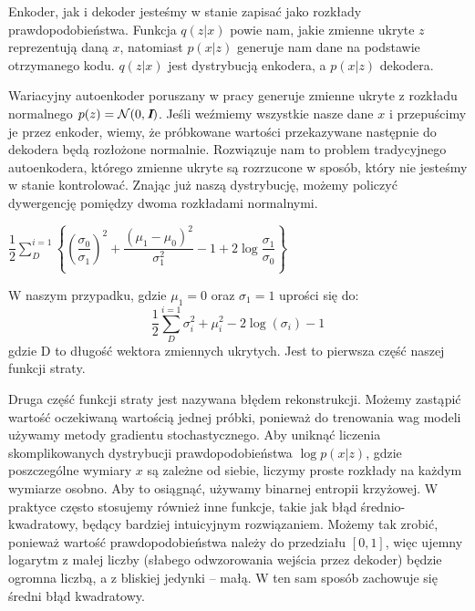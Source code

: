\documentclass[a4paper,12pt,oneside]{book} %
\begin{document}
Enkoder, jak i dekoder jesteśmy w stanie zapisać jako rozkłady prawdopodobieństwa. Funkcja $q(z|x)$ powie nam, jakie zmienne ukryte $z$ reprezentują daną $x$, natomiast $p(x|z)$ generuje nam dane na podstawie otrzymanego kodu. $q(z|x)$ jest dystrybucją enkodera, a $p(x|z)$ dekodera.

Wariacyjny autoenkoder poruszany w pracy generuje zmienne ukryte z rozkładu normalnego $p(z)=\mathcal{N}(0,\textit{\textbf{I}})$. Jeśli weźmiemy wszystkie nasze dane $x$ i przepuścimy je przez enkoder, wiemy, że próbkowane wartości przekazywane następnie do dekodera będą rozłożone normalnie. Rozwiązuje nam to problem tradycyjnego autoenkodera, którego zmienne ukryte są rozrzucone w sposób, który nie jesteśmy w stanie kontrolować. Znając już naszą dystrybucję, możemy policzyć dywergencję pomiędzy dwoma rozkładami normalnymi.
\begin{center}
	$\dfrac{1}{2}\displaystyle\sum_{D}^{i=1}\left\{\left(\dfrac{\sigma_0}{\sigma_1}\right)^2+\dfrac{(\mu_1 - \mu_0)^2}{\sigma_1^2} - 1 + 2\log\dfrac{\sigma_1}{\sigma_0}\right\}$
\end{center}
W naszym przypadku, gdzie $\mu_1 = 0$ oraz $\sigma_1=1$ uprości się do:
\begin{equation}
	\dfrac{1}{2}\displaystyle\sum_{D}^{i=1}\sigma_i^2+\mu_i^2-2\log(\sigma_i)-1
	\label{equ:kld_loss}
\end{equation} 
gdzie D to długość wektora zmiennych ukrytych. Jest to pierwsza część naszej funkcji straty. 

Druga część funkcji straty jest nazywana błędem rekonstrukcji. Możemy zastąpić wartość oczekiwaną wartością jednej próbki, ponieważ do trenowania wag modeli używamy metody gradientu stochastycznego. Aby uniknąć liczenia skomplikowanych dystrybucji prawdopodobieństwa $\log p(x|z)$, gdzie poszczególne wymiary $x$ są zależne od siebie, liczymy proste rozkłady na każdym wymiarze osobno. Aby to osiągnąć, używamy binarnej entropii krzyżowej. W praktyce często stosujemy również inne funkcje, takie jak błąd średnio-kwadratowy, będący bardziej intuicyjnym rozwiązaniem.
Możemy tak zrobić, ponieważ wartość prawdopodobieństwa należy do przedziału $\left[ 0, 1\right] $, więc ujemny logarytm z małej liczby (słabego odwzorowania wejścia przez dekoder) będzie ogromna liczbą, a z bliskiej jedynki -- małą. W ten sam sposób zachowuje się średni błąd kwadratowy.
\newpage
\end{document}
